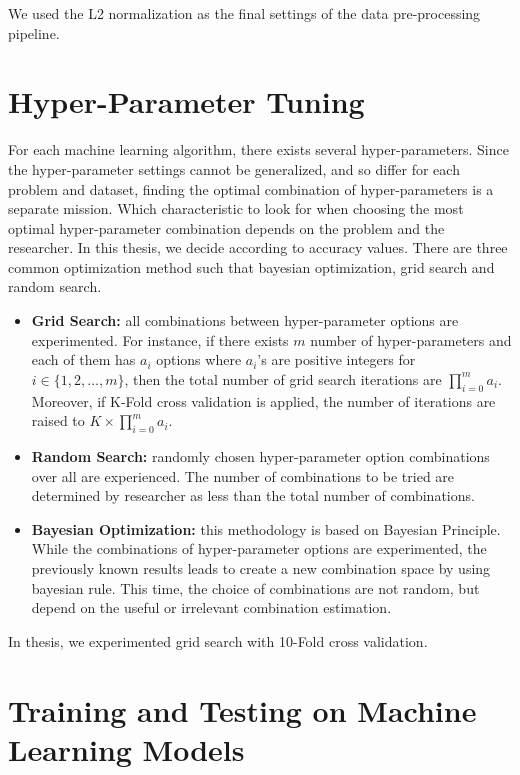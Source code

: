 We used the L2 normalization as the final settings of the data pre-processing pipeline.

\section{Hyper-Parameter Tuning}

For each machine learning algorithm, there exists several hyper-parameters. Since the hyper-parameter settings cannot be generalized, and so differ for each problem and dataset, finding the optimal combination of hyper-parameters is a separate mission. Which characteristic to look for when choosing the most optimal hyper-parameter combination depends on the problem and the researcher. In this thesis, we decide according to accuracy values. There are three common optimization method such that bayesian optimization, grid search and random search.

\begin{itemize}
    
    \item \textbf{Grid Search:} all combinations between hyper-parameter options are experimented. For instance, if there exists $m$ number of hyper-parameters and each of them has $a_{i}$ options where $a_{i}$'s are positive integers for $i \in \{1,2,\dots,m\}$, then the total number of grid search iterations are $\prod_{i=0}^{m} a_{i}$. Moreover, if K-Fold cross validation is applied, the number of iterations are raised to $K \times \prod_{i=0}^{m} a_{i}$.
    
    \item \textbf{Random Search:} randomly chosen hyper-parameter option combinations over all are experienced. The number of combinations to be tried are determined by researcher as less than the total number of combinations.
    
    \item \textbf{Bayesian Optimization:} this methodology is based on Bayesian Principle. While the combinations of hyper-parameter options are experimented, the previously known results leads to create a new combination space by using bayesian rule. This time, the choice of combinations are not random, but depend on the useful or irrelevant combination estimation.
    
\end{itemize}

In thesis, we experimented grid search with 10-Fold cross validation.

\section{Training and Testing on Machine Learning Models}

